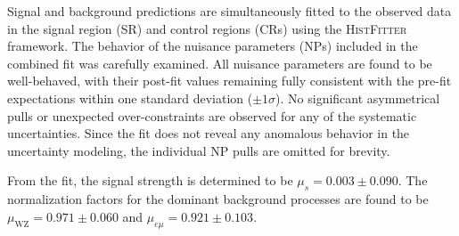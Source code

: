 Signal and background predictions are simultaneously fitted to the observed data in the signal region (SR) and control regions (CRs) using the \textsc{HistFitter} framework. The behavior of the nuisance parameters (NPs) included in the combined fit was carefully examined. All nuisance parameters are found to be well-behaved, with their post-fit values remaining fully consistent with the pre-fit expectations within one standard deviation ($\pm 1\sigma$). No significant asymmetrical pulls or unexpected over-constraints are observed for any of the systematic uncertainties. Since the fit does not reveal any anomalous behavior in the uncertainty modeling, the individual NP pulls are omitted for brevity.

From the fit, the signal strength is determined to be 
$\mu_s = 0.003 \pm 0.090$. 
The normalization factors for the dominant background processes are found to be 
$\mu_{\text{WZ}} = 0.971 \pm 0.060$ and 
$\mu_{e\mu} = 0.921 \pm 0.103$. 

